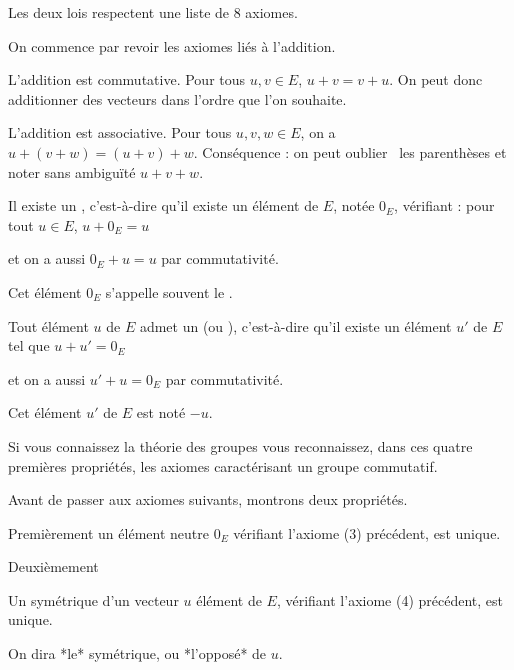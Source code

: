 \diapo

Les deux lois respectent une liste de 8 axiomes.

On commence par revoir les axiomes liés à l'addition.

\change


L'addition est commutative. Pour tous $u,v \in E$, $u + v = v + u$.
 On peut donc additionner des vecteurs dans l'ordre que l'on souhaite.
  
\change

L'addition est associative.  Pour tous $u,v,w \in E$, on a $u + (v+w) = (u+v) +w$.
 Conséquence : on peut \og oublier \fg\ les parenthèses et noter sans ambiguïté $u+v+w$.

\change

 Il existe un , c'est-à-dire qu'il existe un élément de $E$,  
notée $0_{E}$, vérifiant : pour tout $u \in E$, $u+0_{E}=u$ 

\change

et on a aussi $0_E+u=u$ par commutativité.

\change

Cet élément $0_E$ s'appelle souvent le .

\change

Tout élément $u$ de $E$ admet un 
 (ou ), 
 c'est-à-dire qu'il existe un élément $u'$ de $E$ tel que 
$u+u'=0_E$ 

\change

et on a aussi $u'+u=0_E$ par commutativité.

\change

Cet élément $u'$ de $E$ est noté $-u$.


Si vous connaissez la théorie des groupes vous reconnaissez, dans 
ces quatre premières propriétés, les axiomes caractérisant 
un groupe commutatif.

\diapo

Avant de passer aux axiomes suivants, montrons deux propriétés.

Premièrement 
un élément neutre $0_{E}$ vérifiant l'axiome (3) précédent, est unique.

\change

Deuxièmement 

Un symétrique d'un vecteur $u$ élément de $E$, vérifiant l'axiome 
(4) précédent, est unique.

On dira *le* symétrique, ou *l'opposé* de $u$.


